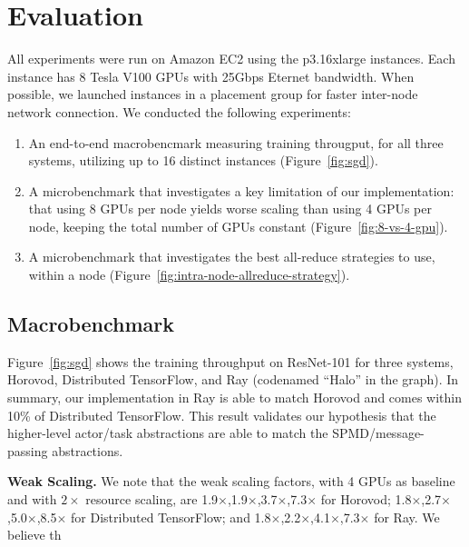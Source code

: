 
\section{Evaluation}
All experiments were run on Amazon EC2 using the p3.16xlarge instances.  Each instance has 8 Tesla V100 GPUs with 25Gbps Eternet bandwidth.  When possible, we launched instances in a placement group for faster inter-node network connection.  We conducted the following experiments:

\begin{enumerate}
    \item An end-to-end macrobencmark measuring training througput, for all three systems, utilizing up to 16 distinct instances (Figure~\ref{fig:sgd}).
    \item A microbenchmark that investigates a key limitation of our implementation: that using 8 GPUs per node yields worse scaling than using 4 GPUs per node, keeping the total number of GPUs constant (Figure~\ref{fig:8-vs-4-gpu}).
    \item A microbenchmark that investigates the best all-reduce strategies to use, within a node (Figure~\ref{fig:intra-node-allreduce-strategy}).
\end{enumerate}


\subsection{Macrobenchmark}
Figure~\ref{fig:sgd} shows the training throughput on ResNet-101 for three systems, Horovod, Distributed TensorFlow, and Ray (codenamed ``Halo'' in the graph).  In summary, our implementation in Ray is able to match Horovod and comes within 10\% of Distributed TensorFlow.  This result validates our hypothesis that the higher-level actor/task abstractions are able to match the SPMD/message-passing abstractions.

{\bf Weak Scaling.}  We note that the weak scaling factors, with 4 GPUs as baseline and with $2\times$ resource scaling, are 1.9$\times$,1.9$\times$,3.7$\times$,7.3$\times$ for Horovod;
1.8$\times$,2.7$\times$,5.0$\times$,8.5$\times$ for Distributed TensorFlow;
and
1.8$\times$,2.2$\times$,4.1$\times$,7.3$\times$ for Ray.  We believe th

